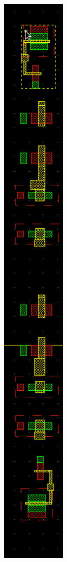 \documentclass[11pt,a4paper,oneside,dutch]{article}
\begin{document}
\begin{figure}[htp]
	\centering
	\begin{subfigure}[b]{0.25\textwidth}
		\centering
		\includegraphics[width=0.397\textwidth]{elementary_frontend.png}

\end{subfigure}
\end{figure}
\end{document}
